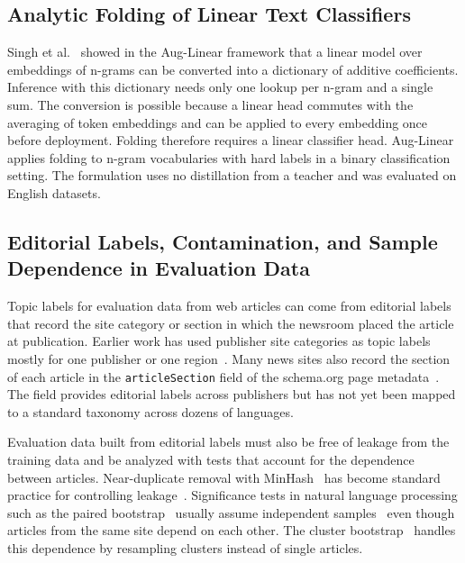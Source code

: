\documentclass{ieeeaccess}
\begin{document}
\subsection{Analytic Folding of Linear Text Classifiers}
\label{sec:rw-fold}
Singh et al.~\cite{singh2023auglinear} showed in the Aug-Linear framework that a linear model over embeddings of n-grams can be converted into a dictionary of additive coefficients. Inference with this dictionary needs only one lookup per n-gram and a single sum. The conversion is possible because a linear head commutes with the averaging of token embeddings and can be applied to every embedding once before deployment. Folding therefore requires a linear classifier head. Aug-Linear applies folding to n-gram vocabularies with hard labels in a binary classification setting. The formulation uses no distillation from a teacher and was evaluated on English datasets.

\subsection{Editorial Labels, Contamination, and Sample Dependence in Evaluation Data}
Topic labels for evaluation data from web articles can come from editorial labels that record the site category or section in which the newsroom placed the article at publication. Earlier work has used publisher site categories as topic labels mostly for one publisher or one region~\cite{mirashi2023indicnews}. Many news sites also record the section of each article in the \texttt{articleSection} field of the schema.org page metadata~\cite{guha2016schema}. The field provides editorial labels across publishers but has not yet been mapped to a standard taxonomy across dozens of languages.

Evaluation data built from editorial labels must also be free of leakage from the training data and be analyzed with tests that account for the dependence between articles. Near-duplicate removal with MinHash~\cite{broder1997resemblance} has become standard practice for controlling leakage~\cite{lee2022dedup}. Significance tests in natural language processing such as the paired bootstrap~\cite{koehn2004significance} usually assume independent samples~\cite{dror2018hitchhiker} even though articles from the same site depend on each other. The cluster bootstrap~\cite{field2007bootstrapping} handles this dependence by resampling clusters instead of single articles.
\end{document}
